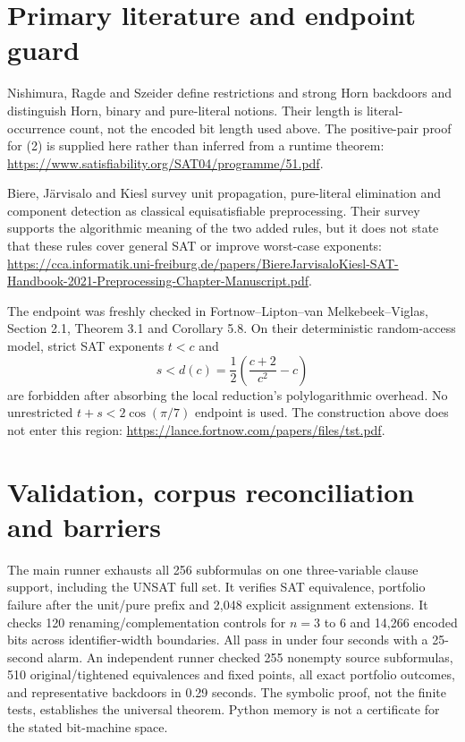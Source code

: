 \documentclass[11pt]{article}
\begin{document}
\section{Primary literature and endpoint guard}
Nishimura, Ragde and Szeider define restrictions and strong Horn backdoors
and distinguish Horn, binary and pure-literal notions. Their length is
literal-occurrence count, not the encoded bit length used above. The
positive-pair proof for (2) is supplied here rather than inferred from a
runtime theorem:
\url{https://www.satisfiability.org/SAT04/programme/51.pdf}.

Biere, J\"arvisalo and Kiesl survey unit propagation, pure-literal
elimination and component detection as classical equisatisfiable
preprocessing. Their survey supports the algorithmic meaning of the two
added rules, but it does not state that these rules cover general SAT or
improve worst-case exponents:
\url{https://cca.informatik.uni-freiburg.de/papers/BiereJarvisaloKiesl-SAT-Handbook-2021-Preprocessing-Chapter-Manuscript.pdf}.

The endpoint was freshly checked in Fortnow--Lipton--van Melkebeek--Viglas,
Section 2.1, Theorem 3.1 and Corollary 5.8. On their deterministic
random-access model, strict SAT exponents $t<c$ and
\[
 s<d(c)=\frac12\left(\frac{c+2}{c^2}-c\right)
\]
are forbidden after absorbing the local reduction's polylogarithmic
overhead. No unrestricted $t+s<2\cos(\pi/7)$ endpoint is used. The
construction above does not enter this region:
\url{https://lance.fortnow.com/papers/files/tst.pdf}.

\section{Validation, corpus reconciliation and barriers}
The main runner exhausts all 256 subformulas on one three-variable clause
support, including the UNSAT full set. It verifies SAT equivalence,
portfolio failure after the unit/pure prefix and 2,048 explicit assignment
extensions. It checks 120 renaming/complementation controls for $n=3$ to
$6$ and 14,266 encoded bits across identifier-width boundaries. All pass
in under four seconds with a 25-second alarm. An independent runner checked
255 nonempty source subformulas, 510 original/tightened equivalences and
fixed points, all exact portfolio outcomes, and representative backdoors
in 0.29 seconds. The symbolic proof, not the
finite tests, establishes the universal theorem. Python memory is not a
certificate for the stated bit-machine space.
\end{document}
